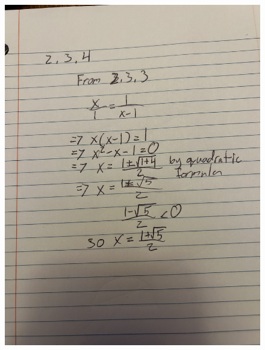 \documentclass[10pt]{article}
\begin{document}
\begin{enumerate}
\begin{figure}
        \includegraphics[scale=0.15]{IMG_0678}
    \end{figure}
\end{enumerate}
\end{document}

